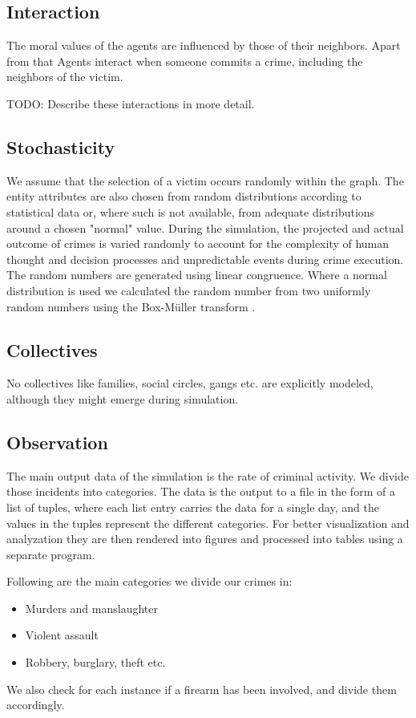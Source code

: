 \documentclass{article}
\begin{document}
		\subsection{Interaction}
			The moral values of the agents are influenced by those of their neighbors. Apart from
			that Agents interact when someone commits a crime, including the neighbors of the victim.
			\par
			TODO: Describe these interactions in more detail.

		\subsection{Stochasticity} \label{stoch}
			We assume that the selection of a victim occurs randomly within the graph.
			The entity attributes are also chosen from random distributions according to
			statistical data or, where such is not available, from adequate distributions
			around a chosen "normal" value. During the simulation, the projected and actual
			outcome of crimes is varied randomly to account for the complexity of human thought
			and decision processes and unpredictable events during crime execution. The random
			numbers are generated using linear congruence. Where a normal distribution is used
			we calculated the random number from two uniformly random numbers using the
			Box-M\"uller transform \cite{boxmuller}.

		\subsection{Collectives}
			No collectives like families, social circles, gangs etc. are explicitly modeled,
			although they might emerge during simulation.

		\subsection{Observation}
			The main output data of the simulation is the rate of criminal activity. We divide
			those incidents into categories. The data is the output to a file in the form of a
			list of tuples, where each list entry carries the data for a single day, and the
			values in the tuples represent the different categories. For better visualization and
			analyzation they are then rendered into figures and processed into tables using a
			separate program.
			\par
			Following are the main categories we divide our crimes in:
			\begin{itemize}
				\item Murders and manslaughter
				\item Violent assault
				\item Robbery, burglary, theft etc.
			\end{itemize}
			We also check for each instance if a firearm has been involved, and divide them
			accordingly.
\end{document}
